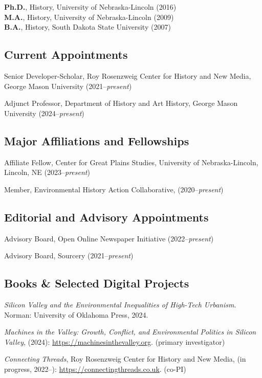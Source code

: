 \documentclass[10pt]{article}
\begin{document}
\textbf{Ph.D.}, History, University of Nebraska-Lincoln (2016) \\
\textbf{M.A.}, History, University of Nebraska-Lincoln (2009) \\
\textbf{B.A.}, History, South Dakota State University (2007)

\subsection{Current Appointments}\label{Appointments}

Senior Developer-Scholar, Roy Rosenzweig Center for History and New Media, George Mason University (2021--\textit{present})

Adjunct Professor, Department of History and Art History, George Mason University (2024--\textit{present})

\subsection{Major Affiliations and Fellowships}\label{affiliations-and-fellowships}

Affiliate Fellow, Center for Great Plains Studies, University of Nebraska-Lincoln, Lincoln, NE (2023--\textit{present})

Member, Environmental History Action Collaborative, (2020--\textit{present})

\subsection{Editorial and Advisory Appointments}\label{editorial-and-advisory-appointments}

Advisory Board, Open Online Newspaper Initiative (2022--\textit{present})

Advisory Board, Sourcery (2021--\textit{present})

\subsection{Books \& Selected Digital Projects}\label{books}

\textit{Silicon Valley and the Environmental Inequalities of High-Tech Urbanism}. Norman: University of Oklahoma Press, 2024.

\emph{Machines in the Valley: Growth, Conflict, and Environmental Politics in Silicon Valley}, (2024): \url{https://machinesinthevalley.org}. (primary investigator)

\emph{Connecting Threads}, Roy Rosenzweig Center for History and New Media, (in progress, 2022--): \url{https://connectingthreads.co.uk}. (co-PI)
\end{document}
